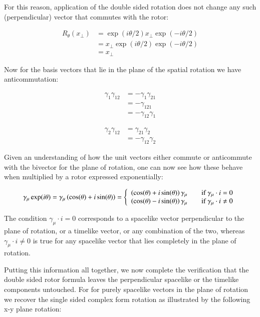 For this reason, application of the double sided rotation does not change any such (perpendicular) vector that commutes with the rotor:

\begin{align*}
R_{\theta}(x_{\perp}) 
&= \exp( i\theta/2) x_{\perp} \exp( -i\theta/2) \\
&= x_{\perp} \exp( i\theta/2) \exp( -i\theta/2) \\
&= x_{\perp}
\end{align*}

Now for the basis vectors that lie in the plane of the spatial rotation we have anticommutation:

\begin{align*}
\gamma_{1} \gamma_{12} 
&= -\gamma_{1} \gamma_{21}  \\
&= -\gamma_{121} \\
&= -\gamma_{12} \gamma_{1}
\end{align*}

\begin{align*}
\gamma_{2} \gamma_{12} 
&= \gamma_{21}\gamma_{2} \\
&= -\gamma_{12}\gamma_{2}
\end{align*}

Given an understanding of how the unit vectors either commute or anticommute with the bivector for the plane of rotation, one can now see how these behave when multiplied by a rotor expressed exponentially:

\begin{equation}\label{eqn:fVecDotInv:spatialcommutationrule}
\gamma_{\mu}\exp(i\theta)
= \gamma_{\mu}\left( \cos(\theta) + i\sin(\theta) \right)
=
\left\{ 
\begin{array}{l l}
\left( \cos(\theta) + i\sin(\theta) \right) \gamma_{\mu} & \quad \mbox{if $\gamma_{\mu} \cdot i = 0$} \\
\left( \cos(\theta) - i\sin(\theta) \right) \gamma_{\mu} & \quad \mbox{if $\gamma_{\mu} \cdot i \ne 0$} \\
\end{array} \right.
\end{equation}

The condition $\gamma_{\mu} \cdot i = 0$ corresponds to a spacelike vector perpendicular to the plane of rotation, or a timelike vector, or any combination of the two, whereas
$\gamma_{\mu} \cdot i \ne 0$ is true for any spacelike vector that lies completely in the plane of rotation.

Putting this information all together, we now complete the verification that the double sided rotor formula leaves the perpendicular spacelike or the timelike components untouched.  For for purely spacelike vectors in the plane of rotation we recover the single sided complex form rotation as illustrated by the following x-y plane rotation:

